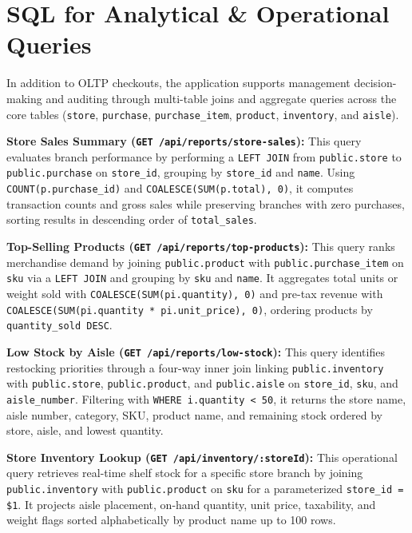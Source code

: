 \documentclass[11pt, a4paper]{article}
\begin{document}
\section{SQL for Analytical \& Operational Queries}
In addition to OLTP checkouts, the application supports management decision-making and auditing through multi-table joins and aggregate queries across the core tables (\texttt{store}, \texttt{purchase}, \texttt{purchase\_item}, \texttt{product}, \texttt{inventory}, and \texttt{aisle}).

\textbf{Store Sales Summary (\texttt{GET /api/reports/store-sales}):} This query evaluates branch performance by performing a \texttt{LEFT JOIN} from \texttt{public.store} to \texttt{public.purchase} on \texttt{store\_id}, grouping by \texttt{store\_id} and \texttt{name}. Using \texttt{COUNT(p.purchase\_id)} and \texttt{COALESCE(SUM(p.total), 0)}, it computes transaction counts and gross sales while preserving branches with zero purchases, sorting results in descending order of \texttt{total\_sales}.

\textbf{Top-Selling Products (\texttt{GET /api/reports/top-products}):} This query ranks merchandise demand by joining \texttt{public.product} with \texttt{public.purchase\_item} on \texttt{sku} via a \texttt{LEFT JOIN} and grouping by \texttt{sku} and \texttt{name}. It aggregates total units or weight sold with \texttt{COALESCE(SUM(pi.quantity), 0)} and pre-tax revenue with \texttt{COALESCE(SUM(pi.quantity * pi.unit\_price), 0)}, ordering products by \texttt{quantity\_sold DESC}.

\textbf{Low Stock by Aisle (\texttt{GET /api/reports/low-stock}):} This query identifies restocking priorities through a four-way inner join linking \texttt{public.inventory} with \texttt{public.store}, \texttt{public.product}, and \texttt{public.aisle} on \texttt{store\_id}, \texttt{sku}, and \texttt{aisle\_number}. Filtering with \texttt{WHERE i.quantity < 50}, it returns the store name, aisle number, category, SKU, product name, and remaining stock ordered by store, aisle, and lowest quantity.

\textbf{Store Inventory Lookup (\texttt{GET /api/inventory/:storeId}):} This operational query retrieves real-time shelf stock for a specific store branch by joining \texttt{public.inventory} with \texttt{public.product} on \texttt{sku} for a parameterized \texttt{store\_id = \$1}. It projects aisle placement, on-hand quantity, unit price, taxability, and weight flags sorted alphabetically by product name up to 100 rows.
\end{document}
